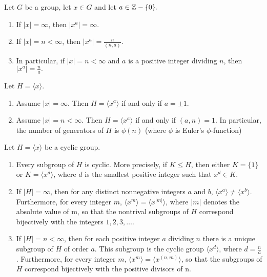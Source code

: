 \documentclass[../main]{subfiles}
\begin{document}
 
 \begin{prop}
  Let $G$ be a group, let $x\in G$ and let $a\in \mathbb{Z}-\{0\}.$
  \begin{enumerate}
   \item If $|x| = \infty$, then $|x^a| = \infty$.
   \item If $|x| = n < \infty$, then $|x^a|=\frac{n}{(n,a)}$.
   \item In particular, if $|x|=n<\infty$ and $a$ is a positive integer dividing $n$, then $|x^a|=\frac{n}{a}.$
  \end{enumerate}
 \end{prop}

 
 \begin{prop}
  Let $H=\langle x\rangle$.
  \begin{enumerate}
   \item Assume $|x|= \infty$. Then $H=\langle x^a \rangle$ if and only if $a=\pm 1$.
   \item Assume $|x| = n <\infty$. Then $H=\langle x^a \rangle$ if and only if $(a,n)=1$. In particular, the number of generators of $H$ is $\phi (n)$ (where $\phi$ is Euler's $\phi$-function)
  \end{enumerate}
 \end{prop}

 
 
 \begin{thm}
  Let $H=\langle x \rangle$ be a cyclic group. 
  \begin{enumerate}
   \item Every subgroup of $H$ is cyclic. More precisely, if $K\leq H$, then either $K=\{1\}$ or $K=\langle x^d \rangle$, where $d$ is the smallest positive integer such that $x^d \in K$.
   \item If $|H| = \infty$, then for any distinct nonnegative integers $a$ and $b$, $\langle x^a \rangle \neq \langle x^b \rangle$. Furthermore, for every integer $m$, $\langle x^m \rangle = \langle x^{|m|} \rangle$, where $|m|$ denotes the absolute value of m, so that the nontrival subgroups of $H$ correspond bijectively with the integers $1,2,3,\ldots$.
   \item If $|H| = n <\infty$, then for each positive integer $a$ dividing $n$ there is a unique subgroup of $H$ of order $a$. This subgroup is the cyclic group $\langle x^d \rangle$, where $d=\frac{n}{a}$. Furthermore, for every integer $m$, $\langle x^m \rangle = \langle x^{(n,m)} \rangle$, so that the subgroups of $H$ correspond bijectively with the positive divisors of n.
  \end{enumerate}
 \end{thm}
\end{document}
